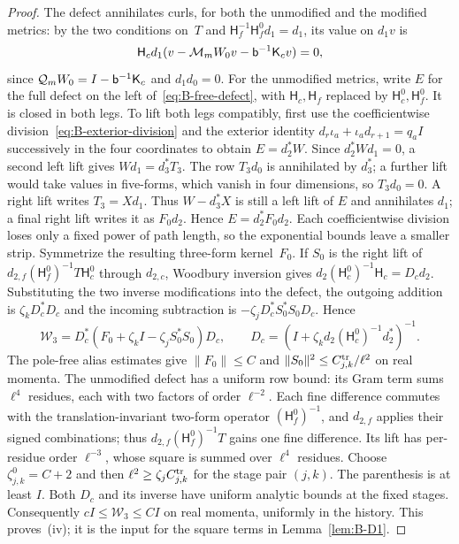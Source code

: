 \begin{proof}
The defect annihilates curls, for both the unmodified and the modified metrics: by the two conditions on~$T$ and $\mathsf H_f^{-1}\mathsf H_f^0d_1=d_1$, its value on $d_1v$ is
\begin{equation*}
\mathsf H_cd_1(v-\mathcal M_mW_0v-\mathsf{b}^{-1}\mathsf K_cv)=0,
\end{equation*}
since $\mathcal Q_mW_0=I-\mathsf{b}^{-1}\mathsf K_c$ and $d_1d_0=0$. For the unmodified metrics, write $E$ for the full defect on the left of~\eqref{eq:B-free-defect}, with $\mathsf H_c,\mathsf H_f$ replaced by $\mathsf H_c^0,\mathsf H_f^0$. It is closed in both legs. To lift both legs compatibly, first use the coefficientwise division~\eqref{eq:B-exterior-division} and the exterior identity $d_r\iota_a+\iota_a d_{r+1}=q_aI$ successively in the four coordinates to obtain $E=d_2^*W$. Since $d_2^*Wd_1=0$, a second left lift gives $Wd_1=d_3^*T_3$. The row $T_3d_0$ is annihilated by $d_3^*$; a further lift would take values in five-forms, which vanish in four dimensions, so $T_3d_0=0$. A right lift writes $T_3=Xd_1$. Thus $W-d_3^*X$ is still a left lift of $E$ and annihilates $d_1$; a final right lift writes it as $F_0d_2$. Hence $E=d_2^*F_0d_2$. Each coefficientwise division loses only a fixed power of path length, so the exponential bounds leave a smaller strip. Symmetrize the resulting three-form kernel~$F_0$. If $S_0$ is the right lift of $d_{2,f}(\mathsf H_f^0)^{-1}T\mathsf H_c^0$ through $d_{2,c}$, Woodbury inversion gives $d_2(\mathsf H_c^0)^{-1}\mathsf H_c=D_cd_2$. Substituting the two inverse modifications into the defect, the outgoing addition is $\zeta_kD_c^*D_c$ and the incoming subtraction is $-\zeta_jD_c^*S_0^*S_0D_c$. Hence
\begin{equation*}
\mathcal W_3=D_c^*(F_0+\zeta_{k}I-\zeta_jS_0^*S_0)D_c,\qquad
D_c=(I+\zeta_{k}d_2(\mathsf H_c^0)^{-1}d_2^*)^{-1}.
\end{equation*}
The pole-free alias estimates give $\|F_0\|\le C$ and $\|S_0\|^2\le C^{\rm tr}_{j,k}/\ell^2$ on real momenta. The unmodified defect has a uniform row bound: its Gram term sums $\ell^4$ residues, each with two factors of order $\ell^{-2}$. Each fine difference commutes with the translation-invariant two-form operator $(\mathsf H_f^0)^{-1}$, and $d_{2,f}$ applies their signed combinations; thus $d_{2,f}(\mathsf H_f^0)^{-1}T$ gains one fine difference. Its lift has per-residue order $\ell^{-3}$, whose square is summed over $\ell^4$ residues. Choose $\zeta^0_{j,k}=C+2$ and then $\ell^2\ge\zeta_jC^{\rm tr}_{j,k}$ for the stage pair $(j,k)$. The parenthesis is at least $I$. Both $D_c$ and its inverse have uniform analytic bounds at the fixed stages. Consequently $cI\le\mathcal W_3\le CI$ on real momenta, uniformly in the history. This proves~(iv); it is the input for the square terms in Lemma~\ref{lem:B-D1}.


\end{proof}
